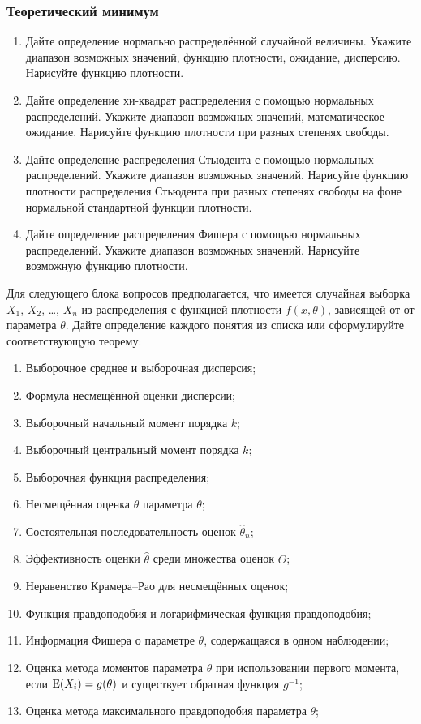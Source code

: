 \subsubsection*{Теоретический минимум}

\begin{enumerate}
  \item Дайте определение нормально распределённой случайной величины.
	Укажите диапазон возможных значений, функцию плотности, ожидание, дисперсию.
	Нарисуйте функцию плотности.
  \item Дайте определение хи-квадрат распределения с помощью нормальных распределений.
	Укажите диапазон возможных значений,
	математическое ожидание.
	Нарисуйте функцию плотности при разных степенях свободы.
  \item Дайте определение распределения Стьюдента с помощью нормальных распределений.
	Укажите диапазон возможных значений.
	Нарисуйте функцию плотности распределения Стьюдента при разных степенях свободы
	на фоне нормальной стандартной функции плотности.
  \item Дайте определение распределения Фишера с помощью нормальных распределений.
	Укажите диапазон возможных значений.
	Нарисуйте возможную функцию плотности.
\end{enumerate}

Для следующего блока вопросов предполагается, что
имеется случайная выборка $X_1$, $X_2$, \ldots, $X_n$ из распределения
с функцией плотности $f(x, \theta)$, зависящей от от параметра $\theta$.
Дайте определение каждого понятия из списка или сформулируйте соответствующую теорему:

\begin{enumerate}[resume]
  \item Выборочное среднее и выборочная дисперсия;
  \item Формула несмещённой оценки дисперсии;
  \item Выборочный начальный момент порядка $k$;
  \item Выборочный центральный момент порядка $k$;
  \item Выборочная функция распределения;
  \item Несмещённая оценка $\hat \theta$ параметра $\theta$;
  \item Состоятельная последовательность оценок $\hat \theta_n$;
  \item Эффективность оценки $\hat \theta$ среди множества оценок $\hat \Theta$;
  \item Неравенство Крамера–Рао для несмещённых оценок;
  \item Функция правдоподобия и логарифмическая функция правдоподобия;
  \item Информация Фишера о параметре $\theta$, содержащаяся в одном наблюдении;
  \item Оценка метода моментов параметра $\theta$ при использовании первого момента,
	если $\operatorname{E}(X_i)=g(\theta)$ и существует обратная функция $g^{-1}$;
  \item Оценка метода максимального правдоподобия параметра $\theta$;
\end{enumerate}

